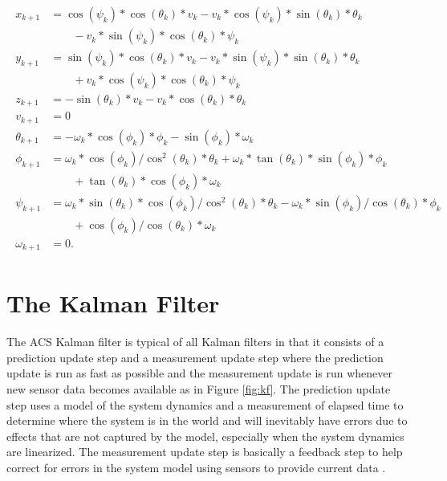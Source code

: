 \begin{align}
\label{eq:kfnonlineardynamics}
\begin{split}
x_{k+1} &= \cos(\psi_k)*\cos(\theta_k)*v_k - v_k*\cos(\psi_k)*\sin(\theta_k)*\theta_k \\
&\qquad- v_k*\sin(\psi_k)*\cos(\theta_k)*\psi_k \\
y_{k+1} &= \sin(\psi_k)*\cos(\theta_k)*v_k - v_k*\sin(\psi_k)*\sin(\theta_k)*\theta_k \\
&\qquad+ v_k*\cos(\psi_k)*\cos(\theta_k)*\psi_k \\
z_{k+1} &= -\sin(\theta_k)*v_k - v_k*\cos(\theta_k)*\theta_k \\
v_{k+1} &= 0 \\
\theta_{k+1} &= -\omega_k *\cos(\phi_k)*\phi_k - \sin(\phi_k)*\omega_k \\
\phi_{k+1} &= \omega_k *\cos(\phi_k)/\cos^2(\theta_k)*\theta_k + \omega_k *\tan(\theta_k)*\sin(\phi_k)*\phi_k \\
&\qquad+ \tan(\theta_k)*\cos(\phi_k)*\omega_k \\
\psi_{k+1} &= \omega_k *\sin(\theta_k)*\cos(\phi_k)/\cos^2(\theta_k)*\theta_k - \omega_k *\sin(\phi_k)/\cos(\theta_k)*\phi_k \\
&\qquad+ \cos(\phi_k)/\cos(\theta_k)*\omega_k \\
\omega_{k+1} &= 0.
\end{split}
\end{align}

\section{The Kalman Filter}
\label{sec:kalmanfilter}
The ACS Kalman filter is typical of all Kalman filters in that it consists of a prediction update step and a measurement update step where the prediction update is run as fast as possible and the measurement update is run whenever new sensor data becomes available as in Figure \ref{fig:kf}. The prediction update step uses a model of the system dynamics and a measurement of elapsed time to determine where the system is in the world and will inevitably have errors due to effects that are not captured by the model, especially when the system dynamics are linearized. The measurement update step is basically a feedback step to help correct for errors in the system model using sensors to provide current data \cite{Kelly_1994_338}.

